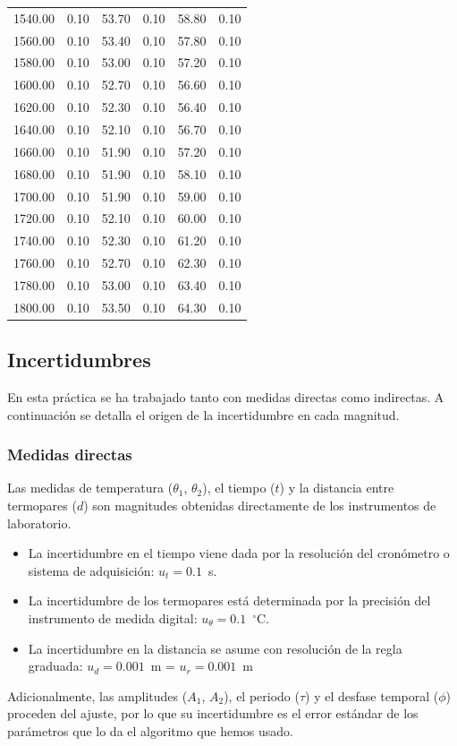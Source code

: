 \documentclass[a4paper,11pt]{article}
\begin{document}
\begin{longtable}{rrrrrr}
    1540.00 & 0.10 & 53.70 & 0.10 & 58.80 & 0.10 \\
    1560.00 & 0.10 & 53.40 & 0.10 & 57.80 & 0.10 \\
    1580.00 & 0.10 & 53.00 & 0.10 & 57.20 & 0.10 \\
    1600.00 & 0.10 & 52.70 & 0.10 & 56.60 & 0.10 \\
    1620.00 & 0.10 & 52.30 & 0.10 & 56.40 & 0.10 \\
    1640.00 & 0.10 & 52.10 & 0.10 & 56.70 & 0.10 \\
    1660.00 & 0.10 & 51.90 & 0.10 & 57.20 & 0.10 \\
    1680.00 & 0.10 & 51.90 & 0.10 & 58.10 & 0.10 \\
    1700.00 & 0.10 & 51.90 & 0.10 & 59.00 & 0.10 \\
    1720.00 & 0.10 & 52.10 & 0.10 & 60.00 & 0.10 \\
    1740.00 & 0.10 & 52.30 & 0.10 & 61.20 & 0.10 \\
    1760.00 & 0.10 & 52.70 & 0.10 & 62.30 & 0.10 \\
    1780.00 & 0.10 & 53.00 & 0.10 & 63.40 & 0.10 \\
    1800.00 & 0.10 & 53.50 & 0.10 & 64.30 & 0.10 \\
\end{longtable}

\subsection{Incertidumbres}

En esta práctica se ha trabajado tanto con medidas directas como indirectas. A continuación se detalla el origen de la incertidumbre en cada magnitud.

\subsubsection*{Medidas directas}
Las medidas de temperatura ($\theta_1$, $\theta_2$), el tiempo ($t$) y la distancia entre termopares ($d$) son magnitudes obtenidas directamente de los instrumentos de laboratorio. 
\begin{itemize}
    \item La incertidumbre en el tiempo viene dada por la resolución del cronómetro o sistema de adquisición: $u_t = 0.1$~s.
    \item La incertidumbre de los termopares está determinada por la precisión del instrumento de medida digital: $u_{\theta} = 0.1$~$^\circ$C.
    \item La incertidumbre en la distancia se asume con resolución de la regla graduada: $u_d = 0.001$~m = $u_r = 0.001$~m
\end{itemize}
Adicionalmente, las amplitudes ($A_1$, $A_2$), el periodo ($\tau$) y el desfase temporal ($\phi$) proceden del ajuste, por lo que su incertidumbre es el error estándar de los parámetros que lo da el algoritmo que hemos usado.
\end{document}
